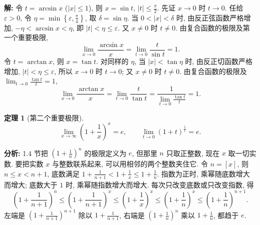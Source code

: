 \documentclass[UTF8,openany]{ctexbook}
\theoremstyle{chinesetextbook}
\newtheorem{theorem}{定理}[section]
\newenvironment{cnsolution}{\par\indent\textbf{解:} \ignorespaces}{\par}
\begin{document}
\begin{cnsolution}
令 $t=\arcsin x$ ($|x|\le1$), 则 $x=\sin t$, $\displaystyle|t|\le\frac\pi2$. 先证 $x\to0$ 时 $t\to0$. 任给 $\varepsilon>0$, 令 $\displaystyle\eta=\min\left\{\varepsilon,\frac\pi4\right\}$, 取 $\delta=\sin\eta$. 当 $0<|x|<\delta$ 时, 由反正弦函数严格增加, $-\eta<\arcsin x<\eta$, 即 $|t|<\eta\le\varepsilon$. 又 $x\ne0$ 时 $t\ne0$. 由复合函数的极限及第一个重要极限,
\[
\lim_{x\to0}\frac{\arcsin x}x=\lim_{t\to0}\frac t{\sin t}=1.
\]
令 $t=\arctan x$, 则 $x=\tan t$. 对同样的 $\eta$, 当 $|x|<\tan\eta$ 时, 由反正切函数严格增加, $|t|<\eta\le\varepsilon$, 所以 $x\to0$ 时 $t\to0$; 又 $x\ne0$ 时 $t\ne0$. 由复合函数的极限及 $\displaystyle\lim_{t\to0}\frac{\tan t}t=1$,
\[
\lim_{x\to0}\frac{\arctan x}x=\lim_{t\to0}\frac t{\tan t}=\frac1{\displaystyle\lim_{t\to0}\frac{\tan t}t}=1.
\]
\end{cnsolution}
\begin{theorem}[第二个重要极限]
\[
\lim_{x\to\infty}\left(1+\frac1x\right)^x=e,\qquad\lim_{t\to0}(1+t)^{\frac1t}=e.
\]
\end{theorem}
\par\indent\textbf{分析:} 1.4 节把 $\displaystyle\left(1+\frac1n\right)^n$ 的极限定义为 $e$, 但那里 $n$ 只取正整数, 现在 $x$ 取一切实数. 要把实数 $x$ 与整数联系起来, 可以用相邻的两个整数夹住它. 令 $n=[x]$, 则 $n\le x<n+1$, 底数满足 $\displaystyle1+\frac1{n+1}<1+\frac1x\le1+\frac1n$. 指数为正时, 乘幂随底数增大而增大; 底数大于 $1$ 时, 乘幂随指数增大而增大. 每次只改变底数或只改变指数, 得
\[
\left(1+\frac1{n+1}\right)^n\le\left(1+\frac1{n+1}\right)^x\le\left(1+\frac1x\right)^x\le\left(1+\frac1n\right)^x\le\left(1+\frac1n\right)^{n+1}.
\]
左端是 $\displaystyle\left(1+\frac1{n+1}\right)^{n+1}$ 除以 $\displaystyle1+\frac1{n+1}$, 右端是 $\displaystyle\left(1+\frac1n\right)^n$ 乘以 $\displaystyle1+\frac1n$, 都趋于 $e$.
\end{document}
